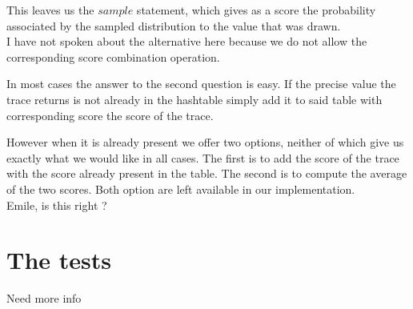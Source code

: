 \documentclass{article}
\newcommand\SC[1]{{\color{violet}{\it \bf Simon :} #1}}
\begin{document}
	This leaves us the $sample$ statement, which gives as a score the probability associated by the sampled distribution to the value that was drawn. \\
	\SC{I have not spoken about the alternative here because we do not allow the corresponding score combination operation.}

	In most cases the answer to the second question is easy. If the precise value the trace returns is not already in the hashtable simply add it to said table with corresponding score the score of the trace.

	However when it is already present we offer two options, neither of which give us exactly what we would like in all cases.
	The first is to add the score of the trace with the score already present in the table.
	The second is to compute the average of the two scores.
	Both option are left available in our implementation. \\
	\SC{Emile, is this right ?}

\section{The tests}

\SC{Need more info}
\end{document}
